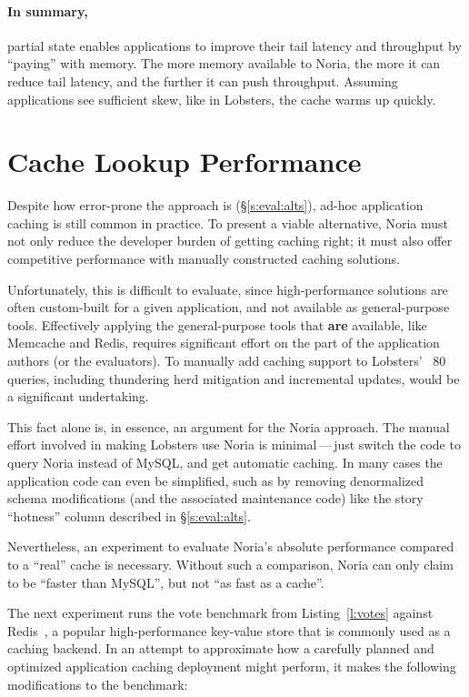 \paragraph{In summary,} partial state enables applications to improve their
tail latency and throughput by ``paying'' with memory. The more memory available
to Noria, the more it can reduce tail latency, and the further it can push
throughput. Assuming applications see sufficient skew, like in Lobsters, the
cache warms up quickly.

\section{Cache Lookup Performance}
\label{s:eval:kvperf}

Despite how error-prone the approach is (\S\ref{s:eval:alts}), ad-hoc
application caching is still common in practice. To present a viable
alternative, Noria must not only reduce the developer burden of getting caching
right; it must also offer competitive performance with manually constructed
caching solutions.

Unfortunately, this is difficult to evaluate, since high-performance solutions
are often custom-built for a given application, and not available as
general-purpose tools. Effectively applying the general-purpose tools that
\textbf{are} available, like Memcache and Redis, requires significant effort on
the part of the application authors (or the evaluators). To manually add caching
support to Lobsters' ~80 queries, including thundering herd mitigation and
incremental updates, would be a significant undertaking.

This fact alone is, in essence, an argument for the Noria approach. The manual
effort involved in making Lobsters use Noria is minimal\,---\,just switch the
code to query Noria instead of MySQL, and get automatic caching. In many cases
the application code can even be simplified, such as by removing denormalized
schema modifications (and the associated maintenance code) like the story
``hotness'' column described in \S\ref{s:eval:alts}.

Nevertheless, an experiment to evaluate Noria's absolute performance compared to
a ``real'' cache is necessary. Without such a comparison, Noria can only claim
to be ``faster than MySQL'', but not ``as fast as a cache''.

The next experiment runs the vote benchmark from Listing~\vref{l:votes} against
Redis~\cite{redis}, a popular high-performance key-value store that is commonly
used as a caching backend. In an attempt to approximate how a carefully planned
and optimized application caching deployment might perform, it makes the
following modifications to the benchmark:

